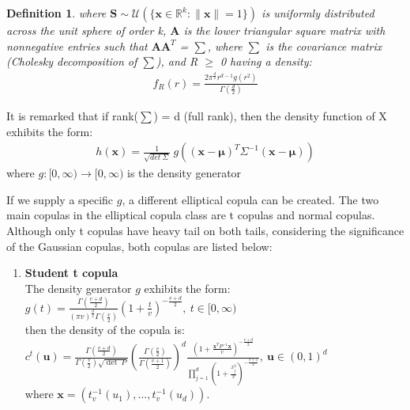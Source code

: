 \documentclass[12pt]{report}
\newtheorem{definition}{Definition}[subsection]
\newcommand{\1}{\mathbf{1}}
\begin{document}
\begin{flushleft}
\begin{definition}
where $\textbf{S} \sim \mathcal{U}( \{ \textbf{x} \in \mathbb{R}^{k} : \|\textbf{x}\| = 1 \} )$ is uniformly distributed across the unit sphere of order k, $\textbf{A}$ is the lower triangular square matrix with nonnegative entries such that $\textbf{A}\textbf{A}^{T}$ = $\sum$, where $\sum$ is the covariance matrix (Cholesky decomposition of $\sum$), and R $\ge$ 0 having a density:
\begin{align*}
f_{R}(r) = \frac{2 \pi^{\frac{d}{2}} r^{d-1} g(r^{2})}{\Gamma(\frac{d}{2})}
\end{align*}
\end{definition}

It is remarked that if rank($\sum$) = d (full rank), then the density function of X exhibits the form: \\

\begin{align*}
h(\textbf{x}) = \frac{1}{\sqrt{det \: \Sigma}} \: g \left( (\textbf{x} - \boldsymbol{\mu})^{T} \Sigma^{-1} (\textbf{x} - \boldsymbol{\mu})  \right)
\end{align*}
where $g : [0,\infty) \rightarrow [0,\infty)$ is the density generator

If we supply a specific $g$, a different elliptical copula can be created. The two main copulas in the elliptical copula class are t copulas and normal copulas. Although only t copulas have heavy tail on both tails, considering the significance of the Gaussian copulas, both copulas are listed below: \\

\begin{enumerate}
\item \textbf{Student t copula} \textit{\normalfont\parencite{HofertBook}} \\

The density generator $g$ exhibits the form:\\
\vspace{0.5cm}
$g(t) = \frac{\Gamma(\frac{v+d}{2})}{(\pi v)^{\frac{d}{2}}\Gamma(\frac{v}{2})} \left( 1+\frac{t}{v} \right) ^{-\frac{v+d}{2}}, \: t \in [0,\infty)$ \\
\vspace{0.5cm}
then the density of the copula is:\\
\vspace{0.5cm}
$ c^{t}(\textbf{u}) = \frac{\Gamma(\frac{v+d}{2})}{\Gamma(\frac{v}{2})\sqrt{\det \: P}} \left( \frac{\Gamma(\frac{v}{2})}{\Gamma(\frac{v+1}{2})} \right)^{d} \frac{ (1 + \frac{\textbf{x}^{T}P^{-1}\textbf{x}}{v})^{-\frac{v+d}{2}}}{\prod_{j = 1}^{d} (1 + \frac{x_{j}^{2}}{v})^{-\frac{v+1}{2}}} , \: \textbf{u} \in (0,1)^{d}$ \\
\vspace{0.5cm}
where $\textbf{x} = (t^{-1}_{v}(u_{1}), \dots, t^{-1}_{v}(u_{d}))$.\\


\end{enumerate}
\end{flushleft}
\end{document}
